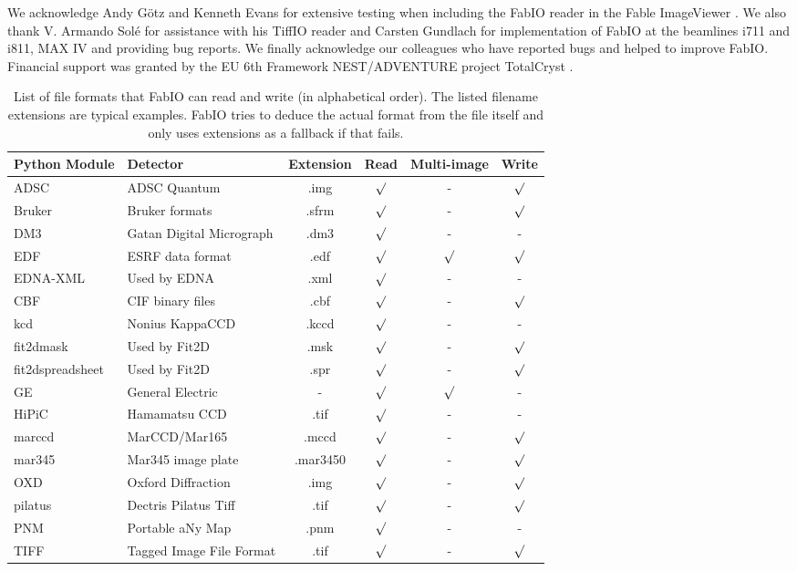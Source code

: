 \documentclass[preprint]{iucr}
\begin{document}

We acknowledge Andy G\"otz and Kenneth Evans for extensive testing when including
the FabIO reader in the Fable ImageViewer \cite{fable}.
We also thank V. Armando Sol\'e for assistance with his TiffIO reader and
Carsten Gundlach for implementation of FabIO at the beamlines i711 and i811, 
MAX IV and providing bug reports.
We finally acknowledge our colleagues who have reported bugs and helped to
improve FabIO.
Financial support was granted by the EU 6th Framework NEST/ADVENTURE project
TotalCryst \cite{totalcryst}.






\begin{table}
\caption{List of file formats that FabIO can read and write (in
alphabetical order). The listed filename extensions are typical examples.
FabIO tries to deduce the actual format from the file itself and only
uses extensions as a fallback if that fails.}
\label{format}
\vspace{1mm}
\begin{center}
\begin{tabular}{llcccc}
Python Module   & Detector		& Extension & Read & Multi-image	& Write\\
\hline 
ADSC		&   ADSC Quantum				&	.img	&	$\surd$&	-	&	$\surd$		\\
Bruker		&   Bruker formats				&	.sfrm	&	$\surd$&	-	&	$\surd$		\\
DM3			&	Gatan Digital Micrograph	&	.dm3	&	$\surd$&	-	&	-	\\
EDF		    &   ESRF data format			&	.edf	&	$\surd$&	$\surd$		&	$\surd$		\\
EDNA-XML	& 	Used by EDNA \cite{edna} 	&	.xml	&	$\surd$&	-	&	-	 \\
CBF		    &   CIF binary files			&	.cbf	&	$\surd$&	- 	& 	$\surd$		\\
kcd	    	&   Nonius 	KappaCCD			&	.kccd	&	$\surd$&	- 	&	-		\\
fit2dmask  	&	Used by Fit2D \cite{fit2d}	&   .msk    &	$\surd$&   -  &   $\surd$  \\
fit2dspreadsheet & Used by Fit2D \cite{fit2d}	&  .spr    &	$\surd$&   -  & $\surd$    \\
GE		    &   General Electric	&	-		&	$\surd$&	$\surd$	&	-		\\
HiPiC       & 	Hamamatsu CCD 		&	.tif	&	$\surd$&	-	&	-	 	\\
marccd		&   MarCCD/Mar165		&	.mccd	&	$\surd$&	-	&	$\surd$		\\
mar345		&   Mar345 image plate	&	.mar3450		&	$\surd$&	-	&	$\surd$		\\
OXD		    &   Oxford Diffraction 	&	.img	&	$\surd$&	-	&	$\surd$		\\
pilatus	    & Dectris Pilatus Tiff	&	.tif	&	$\surd$&	-	&	$\surd$		\\
PNM			&	Portable aNy Map	& .pnm	&	$\surd$&	-	&	-		\\
TIFF		&	Tagged Image File Format	&	.tif	&	$\surd$&	-	&	$\surd$		\\
\end{tabular}
\end{center}
\end{table}
\end{document}
